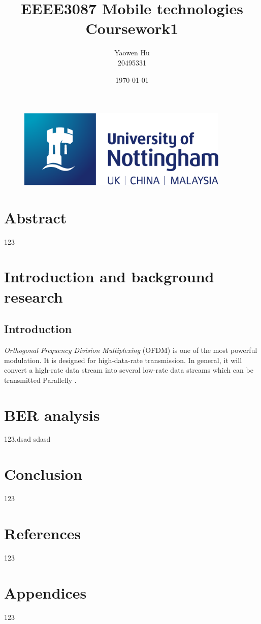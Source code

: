 \documentclass{article}
\title{EEEE3087 Mobile technologies \\Coursework1}
\author{Yaowen Hu\\20495331}
\date{\today}
\begin{document}
\begin{titlepage}
\begin{figure}
    \vspace{-4em}
    \centering
    \includegraphics[width=0.9\textwidth]{images/logo.png}
\end{figure}
\vfill
\maketitle
\vfill
{}
\pagebreak
\end{titlepage}

\tableofcontents
\pagebreak
\section*{Abstract}
123

\section{Introduction and background research}
\subsection{Introduction}
\textit{Orthogonal Frequency Division Multiplexing} (OFDM) is one of the most powerful modulation. It is designed for high-data-rate transmission. In general, it will convert a high-rate data stream into several low-rate data streams which can be transmitted Parallelly \cite{RN79}.



\section{BER analysis}
123\cite{RN79},dsad
sdasd

\section{Conclusion}
123

\section{References}
123

\section{Appendices}
123



	
\end{document}
